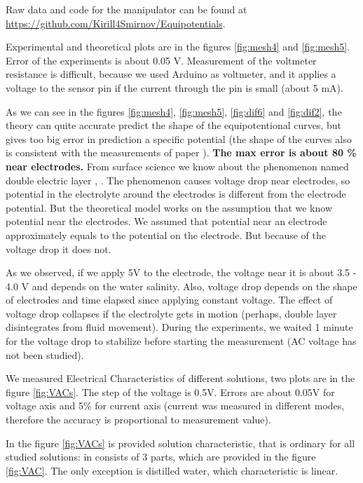 \documentclass{article}
\begin{document}
Raw data and code for the manipulator can be found at \url{https://github.com/Kirill4Smirnov/Equipotentials}. \par

Experimental and theoretical plots are in the figures \ref{fig:mesh4} and \ref{fig:mesh5}. Error of the experiments is about 0.05 V. Measurement of the voltmeter resistance is difficult, because we used Arduino as voltmeter, and it applies a voltage to the sensor pin if the current through the pin is small (about 5 mA). \par


As we can see in the figures \ref{fig:mesh4}, \ref{fig:mesh5}, \ref{fig:dif6} and \ref{fig:dif2}, the theory can quite accurate predict the shape of the equipotentional curves, but gives too big error in prediction a specific potential (the shape of the curves also is consistent with the measurements of paper \cite{binder2015high}). \textbf{The max error is about 80 \% near electrodes.} From surface science we know about the phenomenon named double electric layer \cite{kinetika}, \cite{stillinger}. The phenomenon causes voltage drop near electrodes, so potential in the electrolyte around the electrodes is different from the electrode potential. But the theoretical model works on the assumption that we know potential near the electrodes. We assumed that potential near an electrode approximately equals to the potential on the electrode. But because of the voltage drop it does not. \par


As we observed, if we apply 5V to the electrode, the voltage near it is about 3.5 - 4.0 V and depends on the water salinity. Also, voltage drop depends on the shape of electrodes and time elapsed since applying constant voltage. The effect of voltage drop collapses if the electrolyte gets in motion (perhaps, double layer disintegrates from fluid movement). During the experiments, we waited 1 minute for the voltage drop to stabilize before starting the measurement (AC voltage has not been studied).\par

We measured Electrical Characteristics of different solutions, two plots are in the figure \ref{fig:VACs}. The step of the voltage is 0.5V. Errors are about 0.05V for voltage axis and 5\% for current axis (current was measured in different modes, therefore the accuracy is proportional to measurement value).


In the figure \ref{fig:VACs} is provided solution characteristic, that is ordinary for all studied solutions: in consists of 3 parts, which are provided in the figure \ref{fig:VAC}. The only exception is distilled water, which characteristic is linear.
\end{document}
